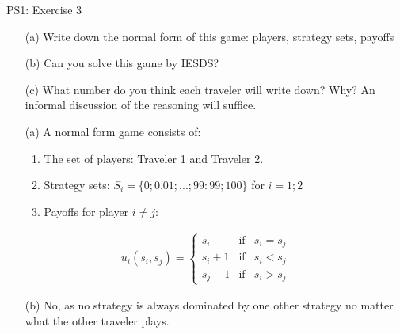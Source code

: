 \begin{frame}{PS1: Exercise 3}
\begin{multicols}{2}
  \begin{itemize}
    \item[(a)] Write down the normal form of this game: players, strategy sets, payoffs
  \item[(b)] Can you solve this game by IESDS?
  \item[(c)] What number do you think each traveler will write down? Why? An informal
  discussion of the reasoning will suffice.
  \end{itemize}
\vfill\null
\columnbreak
\begin{itemize}
  \item[(a)] A normal form game consists of:
    \begin{enumerate}
      \item The set of players: Traveler 1 and Traveler 2.
      \item Strategy sets: $S_i = \{0; 0.01; ... ; 99:99; 100\}$ for $i = 1; 2$
      \item Payoffs for player $i\neq j$:
    \end{enumerate}
\end{itemize}
\begin{align*}
  u_i(s_i,s_j)=
  \left\{ \begin{array}{ccl}
  s_i   & \mbox{if} & s_i=s_j \\
  s_i+1 & \mbox{if} & s_i<s_j \\
  s_j-1 & \mbox{if} & s_i>s_j
  \end{array}\right.
\end{align*}
\begin{itemize}
  \item[(b)] No, as no strategy is always dominated by one other strategy no matter what the other traveler plays.
\end{itemize}
\vfill\null
\end{multicols}
\end{frame}

